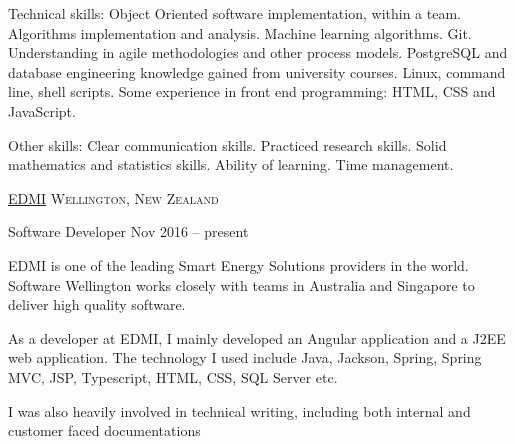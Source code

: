 \documentclass[10pt,a4paper]{article}
\begin{document}
\vspace{0.5em}

\inlineheadsection  %
  {Technical skills:}
  {
    Object Oriented software implementation, within a team.
    Algorithms implementation and analysis.
    Machine learning algorithms.
    Git.
    Understanding in agile methodologies and other process models.
    PostgreSQL and database engineering knowledge gained from university courses.
    Linux, command line, shell scripts.
    Some experience in front end programming: HTML, CSS and JavaScript.
  }

\vspace{0.5em}

\inlineheadsection  %
  {Other skills:}
  {
    Clear communication skills.
    Practiced research skills.
    Solid mathematics and statistics skills.
    Ability of learning.
    Time management.
  }


\spacedhrule{1.6em}{-0.4em}


\headedsection
  {\href{http://www.edmi-meters.com/}{EDMI}}
  {\textsc{Wellington, New Zealand}}
  {

    \headedsubsection
      {Software Developer}
      {Nov 2016 -- present}
      {\bodytext
        {
          EDMI is one of the leading Smart Energy Solutions providers in the world.
          Software Wellington works closely with teams in Australia and Singapore to deliver high quality software.
    
          As a developer at EDMI, I mainly developed an Angular application and a J2EE web application.
          The technology I used include Java, Jackson, Spring, Spring MVC, JSP, Typescript, HTML, CSS, SQL Server etc.
    
          I was also heavily involved in technical writing, including both internal and customer faced documentations

        }
      }
  }
\end{document}
